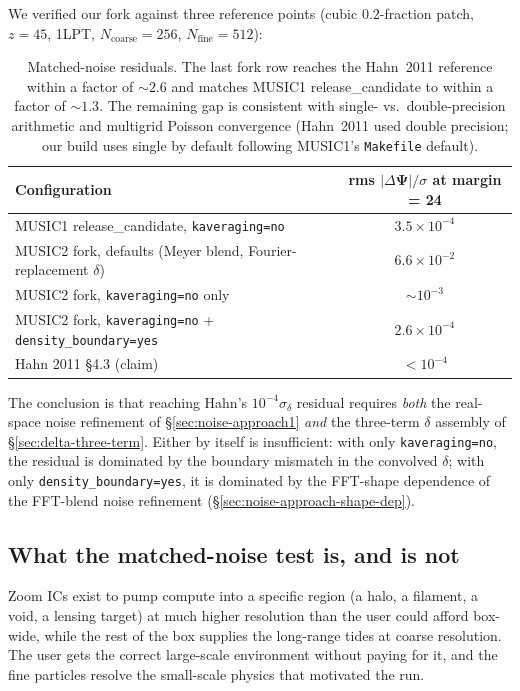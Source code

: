 \documentclass[12pt]{article}
\newcommand{\code}[1]{\texttt{#1}}
\begin{document}
We verified our fork against three reference points (cubic
$0.2$-fraction patch, $z = 45$, 1LPT, $N_\mathrm{coarse} = 256$,
$N_\mathrm{fine} = 512$):

\begin{table}[h]
\centering
\small
\begin{tabular}{lc}
\toprule
Configuration & rms $|\Delta\boldsymbol\Psi|/\sigma$ at margin = 24 \\
\midrule
MUSIC1 release\_candidate, \code{kaveraging=no}              & $3.5 \times 10^{-4}$ \\
MUSIC2 fork, defaults (Meyer blend, Fourier-replacement $\delta$)  & $6.6 \times 10^{-2}$ \\
MUSIC2 fork, \code{kaveraging=no} only                          & $\sim 10^{-3}$ \\
MUSIC2 fork, \code{kaveraging=no} + \code{density\_boundary=yes} & $2.6 \times 10^{-4}$ \\
Hahn 2011 §4.3 (claim)                                          & $< 10^{-4}$ \\
\bottomrule
\end{tabular}
\caption{Matched-noise residuals.  The last fork row reaches the
Hahn~2011 reference within a factor of $\sim 2.6$ and matches
MUSIC1 release\_candidate to within a factor of $\sim 1.3$.
The remaining gap is consistent with single- vs.\ double-precision
arithmetic and multigrid Poisson convergence (Hahn~2011 used double
precision; our build uses single by default following MUSIC1's
\texttt{Makefile} default).}
\label{tab:validation}
\end{table}

The conclusion is that reaching Hahn's $10^{-4}\sigma_\delta$
residual requires \emph{both} the real-space noise refinement of
\S\ref{sec:noise-approach1} \emph{and} the three-term $\delta$
assembly of \S\ref{sec:delta-three-term}.  Either by itself is
insufficient: with only \code{kaveraging=no}, the residual is
dominated by the boundary mismatch in the convolved $\delta$;
with only \code{density\_boundary=yes}, it is dominated by the
FFT-shape dependence of the FFT-blend noise refinement
(\S\ref{sec:noise-approach-shape-dep}).

\subsection{What the matched-noise test is, and is not}
\label{sec:matched-noise-purpose}

Zoom ICs exist to pump compute into a specific region (a halo, a
filament, a void, a lensing target) at much higher resolution than
the user could afford box-wide, while the rest of the box supplies
the long-range tides at coarse resolution.  The user gets the
correct large-scale environment without paying for it, and the fine
particles resolve the small-scale physics that motivated the run.
\end{document}
